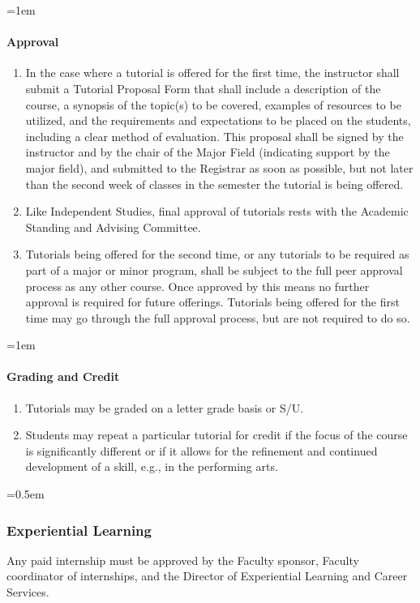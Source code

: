 \documentclass{manual}
\let\oldsubsubsection\subsubsection
\renewcommand\subsubsection{\leftskip=0.5em\oldsubsubsection}
\let\oldparagraph\paragraph
\renewcommand\paragraph{\leftskip=1em\oldparagraph}
\newcommand{\itemLevelA}{\alph*.}
\newcommand{\itemRefA}{\alph*}
\begin{document}
			\paragraph{Approval }

				\begin{enumerate}[label=\itemLevelA,ref=\itemRefA]
				\item In the case where a tutorial is offered for the first time, the instructor shall submit a Tutorial Proposal Form that shall include a description of the course, a synopsis of the topic(s) to be covered, examples of resources to be utilized, and the requirements and expectations to be placed on the students, including a clear method of evaluation.  This proposal shall be signed by the instructor and by the chair of the Major Field (indicating support by the major field), and submitted to the Registrar as soon as possible, but not later than the second week of classes in the semester the tutorial is being offered.  
				\item Like Independent Studies, final approval of tutorials rests with the Academic Standing and Advising Committee.
				\item Tutorials being offered for the second time, or any tutorials to be required as part of a major or minor program, shall be subject to the full peer approval process as any other course.  Once approved by this means no further approval is required for future offerings.  Tutorials being offered for the first time may go through the full approval process, but are not required to do so.
				\end{enumerate}

			\paragraph{Grading and Credit}

				\begin{enumerate}[label=\itemLevelA,ref=\itemRefA]
				\item Tutorials may be graded on a letter grade basis or S/U.
				\item Students may repeat a particular tutorial for credit if the focus of the course is significantly different or if it allows for the refinement and continued development of a skill, e.g., in the performing arts.  
				\end{enumerate}

		\subsubsection{Experiential Learning}
		Any paid internship must be approved by the Faculty sponsor, Faculty coordinator of internships, and the Director of Experiential Learning and Career Services. 
\end{document}

